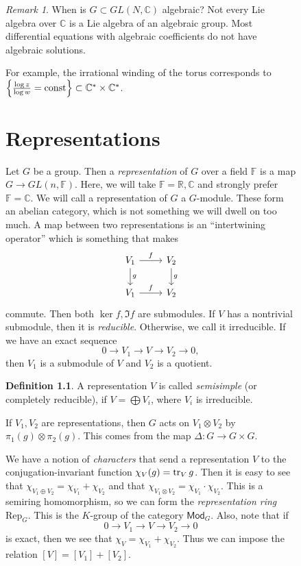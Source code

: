 \documentclass[leqno, openany]{memoir}
\theoremstyle{definition}
\newtheorem{defn}[thm]{Definition}
\theoremstyle{remark}
\newtheorem{rmk}[thm]{Remark}
\theoremstyle{plain}
\theoremstyle{definition}
\theoremstyle{remark}
\newcommand{\F}{\mathbb{F}}
\newcommand{\R}{\mathbb{R}}
\newcommand{\C}{\mathbb{C}}
\newcommand{\mr}[1]{\mathrm{#1}}
\newcommand{\ms}[1]{\mathsf{#1}}
\begin{document}
\begin{figure}[H]
\begin{rmk} When is $G \subset GL(N, \C)$ algebraic? Not every Lie algebra over
    $\C$ is a Lie algebra of an algebraic group. Most differential equations
    with algebraic coefficients do not have algebraic solutions.

    For example, the irrational winding of the torus corresponds to $\qty{
\frac{\log z}{\log w} = \mr{const} } \subset \C^* \times \C^*$.  \end{rmk}

\chapter{Representations}%

Let $G$ be a group. Then a \textit{representation} of $G$ over a field $\F$ is
a map $G \to GL(n, \F)$. Here, we will take $\F = \R, \C$ and strongly prefer
$\F = \C$. We will call a representation of $G$ a $G$-module. These form an
abelian category, which is not something we will dwell on too much. A map
between two representations is an ``intertwining operator'' which is something
that makes \begin{equation*} \begin{tikzcd} V_1 \arrow{r}{f} \arrow{d}{g} & V_2
\arrow{d}{g} \\ V_1 \arrow{r}{f} & V_2 \end{tikzcd} \end{equation*} commute.
Then both $\ker f, \Im f$ are submodules. If $V$ has a nontrivial submodule,
then it is \textit{reducible}. Otherwise, we call it irreducible. If we have an
exact sequence \[ 0 \to V_1 \to V \to V_2 \to 0, \] then $V_1$ is a submodule
of $V$ and $V_2$ is a quotient.

\begin{defn} A representation $V$ is called \textit{semisimple} (or completely
reducible), if $V = \bigoplus V_i$, where $V_i$ is irreducible.  \end{defn}

If $V_1, V_2$ are representations, then $G$ acts on $V_1 \otimes V_2$ by
$\pi_1(g) \otimes \pi_2(g)$. This comes from the map $\Delta \colon G \to G
\times G$.

We have a notion of \textit{characters} that send a representation $V$ to the
conjugation-invariant function $\chi_V(g) = \tr_V g$. Then it is easy to see
that $\chi_{V_1 \oplus V_2} = \chi_{V_1} + \chi_{V_2}$ and that $\chi_{V_1
\otimes V_2} = \chi_{V_1} \cdot \chi_{V_2}$. This is a semiring homomorphism,
so we can form the \textit{representation ring} $\mr{Rep}_G$. This is the
$K$-group of the category $\ms{Mod}_G$. Also, note that if \[ 0 \to V_1 \to V
\to V_2 \to 0 \] is exact, then we see that $\chi_V = \chi_{V_1} + \chi_{V_2}$.
Thus we can impose the relation $[V] = [V_1] + [V_2]$.


\end{figure}
\end{document}
